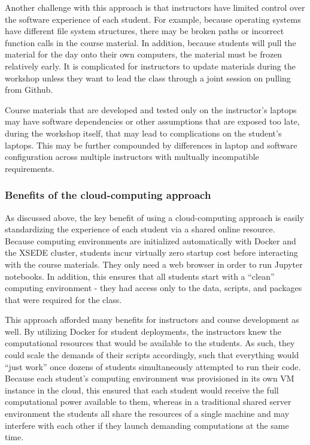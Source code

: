 Another challenge with this approach is that instructors have limited control
over the software experience of each student. For example, because operating
systems have different file system structures, there may be broken paths or
incorrect function calls in the course material. In addition, because students
will pull the material for the day onto their own computers, the material must
be frozen relatively early. It is complicated for instructors to update
materials during the workshop unless they want to lead the class through a joint
session on pulling from Github.

Course materials that are developed and tested only on the instructor's laptops
may have software dependencies or other assumptions that are exposed too late,
during the workshop itself, that may lead to complications on the student's
laptops. This may be further compounded by differences in laptop and software
configuration across multiple instructors with multually incompatible
requirements.

\subsubsection{Benefits of the cloud-computing approach}

As discussed above, the key benefit of using a cloud-computing approach is
easily standardizing the experience of each student via a shared online
resource. Because computing environments are initialized automatically with
Docker and the XSEDE cluster, students incur virtually zero startup cost before
interacting with the course materials. They only need a web browser in order to
run Jupyter notebooks. In addition, this ensures that all students start with a
``clean'' computing environment - they had access only to the data, scripts, and
packages that were required for the class.

This approach afforded many benefits for instructors and course development as
well. By utilizing Docker for student deployments, the instructors knew the
computational resources that would be available to the students. As such, they
could scale the demands of their scripts accordingly, such that everything would
``just work'' once dozens of students simultaneously attempted to run their
code. Because each student's computing environment was provisioned in its own VM
instance in the cloud, this ensured that each student would receive the full
computational power available to them, whereas in a traditional shared server
environment the students all share the resources of a single machine and may
interfere with each other if they launch demanding computations at the same
time.

